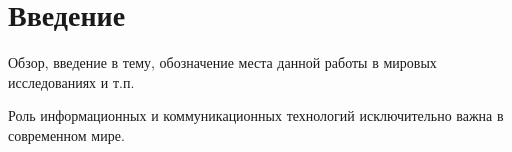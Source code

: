 \chapter*{Введение}							%
Обзор, введение в тему, обозначение места данной работы в мировых исследованиях и т.п.

Роль информационных и коммуникационных технологий исключительно важна в современном мире. 


\clearpage